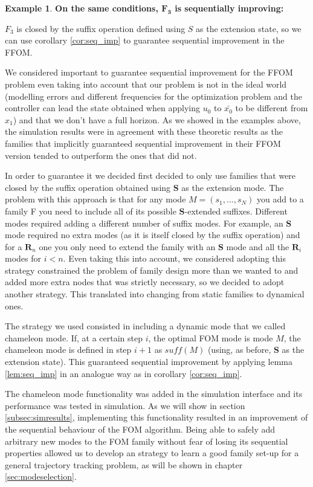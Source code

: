\documentclass[12,twoside]{TFG-GM}
\theoremstyle{definition}
\newtheorem{example}[theorem]{Example}
\theoremstyle{remark}
\newcommand*\diff[1]{\bar{#1}}
\begin{document}
\begin{example} \textbf{On the same conditions, $\boldsymbol{F_3}$ is sequentially improving:}

$F_3$ is closed by the suffix operation defined using $S$ as the extension state, so we can use corollary \ref{cor:seq_imp} to guarantee sequential improvement in the FFOM.
\end{example}

We considered important to guarantee sequential improvement for the FFOM problem even taking into account that our problem is not in the ideal world (modelling errors and different frequencies for the optimization problem and the controller can lead the state obtained when applying $u_0$ to $\diff{x_0}$ to be different from $x_1$) and that we don't have a full horizon. As we showed in the examples above, the simulation results were in agreement with these theoretic results as the families that implicitly guaranteed sequential improvement in their FFOM version tended to outperform the ones that did not.

In order to guarantee it we decided first decided to only use families that were closed by the suffix operation obtained using $\textbf{S}$ as the extension mode. The problem with this approach is that for any mode $M = (s_1, ..., s_N)$ you add to a family F you need to include all of its possible $\textbf{S}$-extended suffixes. Different modes required adding a different number of suffix modes. For example, an $\textbf{S}$ mode required no extra modes (as it is itself closed by the suffix operation) and for a $\textbf{R}_n$ one you only need to extend the family with an $\textbf{S}$ mode and all the $\textbf{R}_i$ modes for $i < n$. Even taking this into account, we considered adopting this strategy constrained the problem of family design more than we wanted to and added more extra nodes that was strictly necessary, so we decided to adopt another strategy. This translated into changing from static families to dynamical ones.

The strategy we used consisted in including a dynamic mode that we called chameleon mode. If, at a certain step $i$, the optimal FOM mode is mode $M$, the chameleon mode is defined in step $i + 1$ as $suff(M)$ (using, as before, $\textbf{S}$ as the extension state). This guaranteed sequential improvement by applying lemma \ref{lem:seq_imp} in an analogue way as in corollary \ref{cor:seq_imp}.

The chameleon mode functionality was added in the simulation interface and its performance was tested in simulation. As we will show in section \ref{subsec:simresults}, implementing this functionality resulted in an improvement of the sequential behaviour of the FOM algorithm. Being able to safely add arbitrary new modes to the FOM family without fear of losing its sequential properties allowed us to develop an strategy to learn a good family set-up for a general trajectory tracking problem, as will be shown in chapter \ref{sec:modeselection}.
\end{document}
